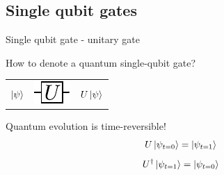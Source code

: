 \subsection{Single qubit gates}
\begin{frame}{Single qubit gate - unitary gate}
\begin{block}{How to denote a quantum single-qubit gate?}
\vspace{0.5cm}
\centering

\begin{tabular}{c c c}
$\ket{\psi}$ &
\includegraphics[valign=m, scale=1]{pics/unitary} &   $U \ket\psi$
\end{tabular}
\end{block}

\vspace{1cm}
\begin{block}{Quantum evolution is time-reversible!}
\begin{equation*}
U\ket{\psi_{t=0}} = \ket{\psi_{t=1}}
\end{equation*}
\begin{equation*}
U^\dagger\ket{\psi_{t=1}} = \ket{\psi_{t=0}}
\end{equation*}
\end{block}
\end{frame}
